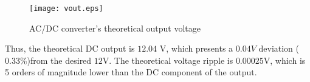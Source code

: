  \begin{figure}[H]
   \centering
   \texttt{[image: vout.eps]}
   \caption{AC/DC converter's theoretical output voltage}
   \label{fig:VoltageRegulatorOutput}
 \end{figure}


Thus, the theoretical DC output is $12.04$ V, which presents a $0.04V$ deviation ($0.33$\%)from the desired $12$V. The theoretical voltage ripple is $0.00025$V, which is 5 orders of magnitude lower than the DC component of the output.
